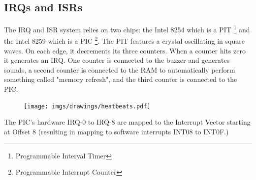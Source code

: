 \subsection{IRQs and ISRs}
The IRQ and ISR system relies on two chips: the Intel 8254 which is a PIT \footnote{Programmable Interval Timer} and the Intel 8259 which is a PIC \footnote{Programmable Interrupt Counter}. The PIT features a crystal oscillating in square waves. On each edge, it decrements its three counters. When a counter hits zero it generates an IRQ. One counter is connected to the buzzer and generates sounds, a second counter is connected to the RAM to automatically perform something called "memory refresh", and the third counter is connected to the PIC.\\
\par
\begin{figure}[H]
\centering
 \texttt{[image: imgs/drawings/heatbeats.pdf]}
 \end{figure}
\par

The PIC's hardware IRQ-0 to IRQ-8 are mapped to the Interrupt Vector starting at Offset 8 (resulting in mapping to software interrupts INT08 to INT0F.)\\

